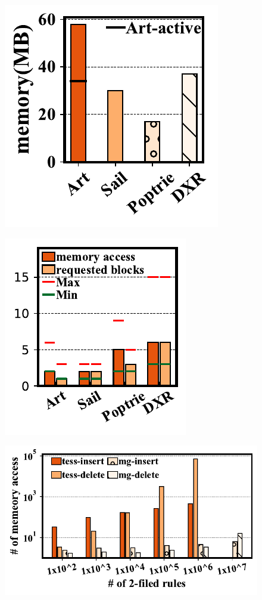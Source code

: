 \documentclass[a4paper]{article}
\begin{document}
    \begin{figure}[htbp]
        \includegraphics{../result/example7.pdf}
    \end{figure}

    \begin{figure}[htbp]
        \includegraphics{../result/example8.pdf}
    \end{figure}

    \begin{figure}[htbp]
        \includegraphics[width=\linewidth]{../result/example9.pdf}
    \end{figure}
\end{document}
